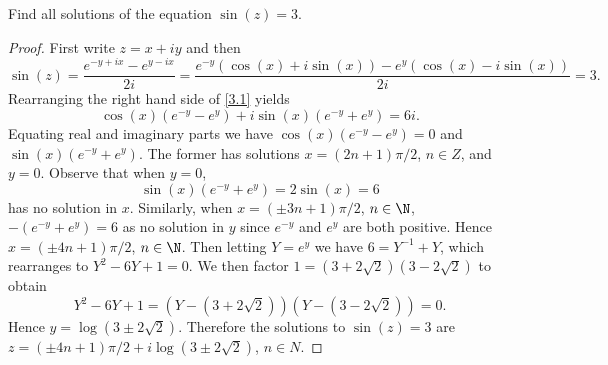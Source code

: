\documentclass[12pt]{amsart}
\begin{document}
\begin{thm}
  Find all solutions of the equation $\sin(z) = 3$.
  \begin{proof}
    First write $z = x + iy$ and then
    \begin{equation}\label{3.1}
      \sin(z) = \frac{e^{-y + ix} - e^{y - ix}}{2i} = \frac{e^{-y}(\cos(x) + i\sin(x)) - e^y(\cos(x) - i\sin(x))}{2i} = 3.
    \end{equation}
    Rearranging the right hand side of \eqref{3.1} yields
    $$\cos(x)(e^{-y} - e^{y}) + i\sin(x)(e^{-y} + e^y) = 6i.$$
    Equating real and imaginary parts we have $\cos(x)(e^{-y} - e^{y}) = 0$ and $\sin(x)(e^{-y} + e^y)$.
    The former has solutions $x = (2n + 1)\pi/2$, $n \in Z$, and $y = 0$.
    Observe that when $y = 0$, $$\sin(x)(e^{-y} + e^y) = 2\sin(x) = 6$$ has no solution in $x$.
    Similarly, when $x = (\pm 3n + 1)\pi/2$, $n \in \N$, $-(e^{-y} + e^y) = 6$ as no solution in $y$ since $e^{-y}$ and $e^y$ are both positive.
    Hence $x = (\pm 4n + 1)\pi/2$, $n \in \N$.
    Then letting $Y = e^y$ we have $6 = Y^{-1} + Y$, which rearranges to $Y^2 - 6Y + 1 = 0$.
    We then factor $1 = (3 + 2\sqrt{2})(3 - 2\sqrt{2})$ to obtain $$Y^2 - 6Y + 1 = (Y - (3 + 2\sqrt{2}))(Y - (3 - 2\sqrt{2})) = 0.$$
    Hence $y = \log(3 \pm 2 \sqrt{2})$.
    Therefore the solutions to $\sin(z) = 3$ are $z = (\pm 4n + 1)\pi/2 + i \log(3 \pm 2\sqrt{2})$, $n \in N$.
  \end{proof}
\end{thm}
\end{document}
